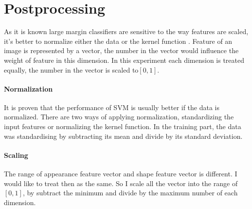 \section{Postprocessing}
As it is known large margin classifiers are sensitive to the way features are scaled, it's better to normalize either the data or the kernel function \cite{ben2010user}. Feature of an image is represented by a vector, the number in the vector would influence the weight of feature in this dimension. In this experiment each dimension is treated equally, the number in the vector is scaled to$[0,1]$.
\paragraph{Normalization}
It is proven that the performance of SVM is usually better if the data is normalized. There are two ways of applying normalization, standardizing the input features or normalizing the kernel function. In the training part, the data was standardising by subtracting its mean and divide by its standard deviation.
\paragraph{Scaling}
The range of appearance feature vector and shape feature vector is different. I would like to treat then as the same. So I scale all the vector into the range of $[0, 1]$, by subtract the minimum and divide by the maximum number of each dimension.